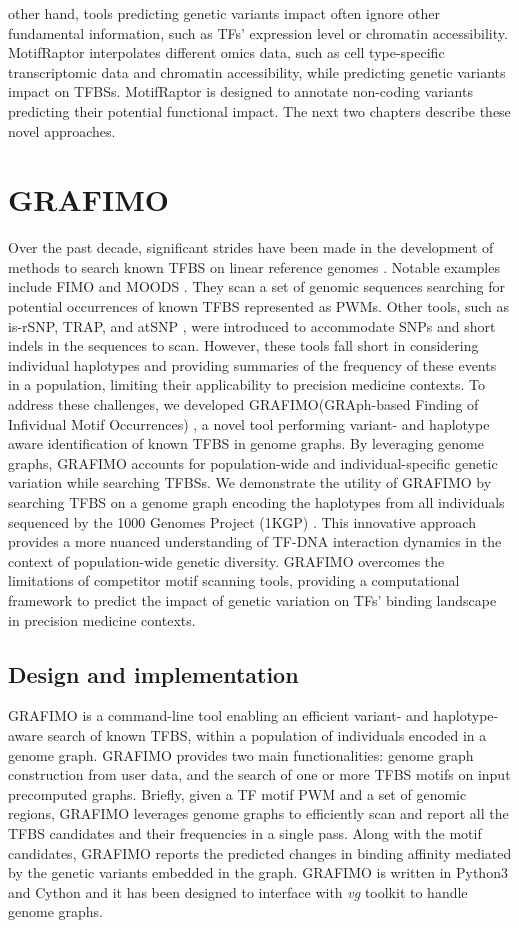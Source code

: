 \documentclass[a4paper, titlepage, openright]{book}
\newcommand{\mychapter}[2]{
    \setcounter{chapter}{#1}
    \setcounter{section}{0}
    \chapter*{#2}
    \addcontentsline{toc}{chapter}{#2}
}
\newcommand{\grafimo}{GRAFIMO\xspace}
\newcommand{\motifraptor}{MotifRaptor\xspace}
\begin{document}
other hand, tools predicting genetic variants impact often ignore other fundamental information, such as TFs' expression level or chromatin accessibility. \motifraptor \citep{yao2021motif} interpolates different omics data, such as cell type-specific transcriptomic data and chromatin accessibility, while predicting genetic variants impact on TFBSs. \motifraptor is designed to annotate non-coding variants predicting their potential functional impact. The next two chapters describe these novel approaches.


\mychapter{5}{\grafimo}
Over the past decade, significant strides have been made in the development of methods to search known TFBS on linear reference genomes \citep{tognon2023survey, boeva2016analysis}. Notable examples include FIMO \citep{grant2011fimo} and MOODS \citep{korhonen2009moods}. They scan a set of genomic sequences searching for potential occurrences of known TFBS represented as PWMs. Other tools, such as is-rSNP, TRAP, and atSNP \citep{macintyre2010rsnp, thomas2011transcription, zuo2015atsnp}, were introduced to accommodate SNPs and short indels in the sequences to scan. However, these tools fall short in considering individual haplotypes and providing summaries of the frequency of these events in a population, limiting their applicability to precision medicine contexts. To address these challenges, we developed \grafimo (GRAph-based Finding of Infividual Motif Occurrences) \citep{tognon2021grafimo}, a novel tool performing variant- and haplotype aware identification of known TFBS in genome graphs. By leveraging genome graphs, \grafimo accounts for population-wide and individual-specific genetic variation while searching TFBSs. We demonstrate the utility of \grafimo by searching TFBS on a genome graph encoding the haplotypes from all individuals sequenced by the 1000 Genomes Project (1KGP) \citep{siva20081000, zheng2017alignment}. This innovative approach provides a more nuanced understanding of TF-DNA interaction dynamics in the context of population-wide genetic diversity. \grafimo overcomes the limitations of competitor motif scanning tools, providing a computational framework to predict the impact of genetic variation on TFs' binding landscape in precision medicine contexts.

\section{Design and implementation}
\grafimo is a command-line tool enabling an efficient variant- and haplotype-aware search of known TFBS, within a population of individuals encoded in a genome graph. \grafimo provides two main functionalities: genome graph construction from user data, and the search of one or more TFBS motifs on input precomputed graphs. Briefly, given a TF motif PWM and a set of genomic regions, \grafimo leverages genome graphs to efficiently scan and report all the TFBS candidates and their frequencies in a single pass. Along with the motif candidates, \grafimo reports the predicted changes in binding affinity mediated by the genetic variants embedded in the graph. \grafimo is written in Python3 and Cython and it has been designed to interface with \emph{vg} toolkit to handle genome graphs.
\end{document}
